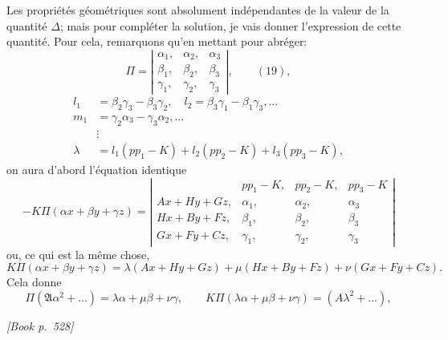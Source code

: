 \documentclass[11pt]{article}
\begin{document}
Les propri\'et\'es g\'eom\'etriques sont absolument ind\'ependantes de la valeur de la quantit\'e $\Delta$; mais pour compl\'eter la solution, je vais donner l'expression de cette quantit\'e. Pour cela, remarquons qu'en mettant pour abr\'eger:
\[
\Pi = \left|\begin{array}{ccc}
\alpha_{1}, & \alpha_{2}, & \alpha_{3} \\
\beta_{1}, & \beta_{2}, & \beta_{3} \\
\gamma_{1}, & \gamma_{2}, & \gamma_{3}
\end{array}\right|,\qquad (19),
\]
\[
\begin{aligned}
l_{1} &= \beta_{2}\gamma_{3} - \beta_{3}\gamma_{2},\quad l_{2} = \beta_{3}\gamma_{1} - \beta_{1}\gamma_{3},\dots\\
m_{1} &= \gamma_{2}\alpha_{3} - \gamma_{3}\alpha_{2},\dots\\
&\vdots\\
\lambda &= l_{1}(p p_{1} - K) + l_{2}(p p_{2} - K) + l_{3}(p p_{3} - K),
\end{aligned}
\]
on aura d'abord l'\'equation identique
\[
-K\Pi(\alpha x + \beta y + \gamma z) = \left|\begin{array}{cccc}
 & p p_{1} - K, & p p_{2} - K, & p p_{3} - K \\
A x + H y + G z, & \alpha_{1}, & \alpha_{2}, & \alpha_{3} \\
H x + B y + F z, & \beta_{1}, & \beta_{2}, & \beta_{3} \\
G x + F y + C z, & \gamma_{1}, & \gamma_{2}, & \gamma_{3}
\end{array}\right|
\]
ou, ce qui est la m\^eme chose,
\[
K\Pi(\alpha x + \beta y + \gamma z) = \lambda(A x + H y + G z) + \mu(H x + B y + F z) + \nu(G x + F y + C z).
\]
Cela donne
\[
\Pi(\mathfrak{A}\alpha^{2} + \dots) = \lambda\alpha + \mu\beta + \nu\gamma,\qquad K\Pi(\lambda\alpha + \mu\beta + \nu\gamma) = (A\lambda^{2} + \dots),
\]

\medskip
\noindent\textit{[Book p.~528]}\hfill

\smallskip
\end{document}
